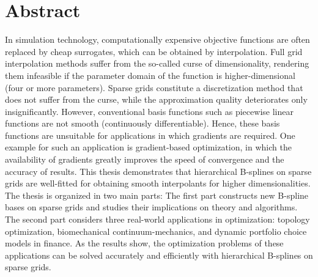 
\printornamentsfalse
\section*{Abstract}
\printornamentstrue

In simulation technology, computationally expensive objective functions
are often replaced by cheap surrogates,
which can be obtained by interpolation.
Full grid interpolation methods suffer from the
so-called curse of dimensionality,
rendering them infeasible if the parameter domain of the function
is higher-dimensional (four or more parameters).
Sparse grids constitute a discretization method that does not suffer from the
curse, while the approximation quality deteriorates only insignificantly.
However, conventional basis functions such as piecewise linear functions
are not smooth (continuously differentiable).
Hence, these basis functions are unsuitable for applications
in which gradients are required.
One example for such an application is gradient-based optimization,
in which the availability of gradients greatly improves the speed of
convergence and the accuracy of results.
This thesis demonstrates that hierarchical B-splines on sparse grids are
well-fitted for obtaining smooth interpolants for higher dimensionalities.
The thesis is organized in two main parts:
The first part constructs new B-spline bases on sparse grids and studies
their implications on theory and algorithms.
The second part considers three real-world applications in optimization:
topology optimization, biomechanical continuum-mechanics, and
dynamic portfolio choice models in finance.
As the results show, the optimization problems of these applications
can be solved accurately and efficiently with hierarchical B-splines on
sparse grids.

